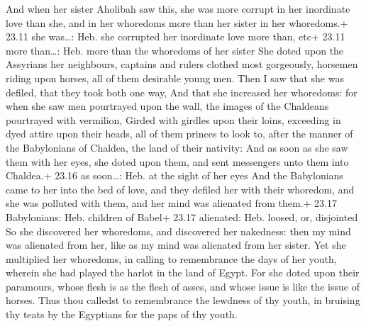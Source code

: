  And when her sister Aholibah saw this, she was more
corrupt in her inordinate love than she, and in her whoredoms more than
her sister in her whoredoms.+ 23.11 she was\ldots: Heb. she corrupted
her inordinate love more than, etc+ 23.11 more than\ldots: Heb. more
than the whoredoms of her sister  She doted upon the
Assyrians her neighbours, captains and rulers clothed most gorgeously,
horsemen riding upon horses, all of them desirable young men.
 Then I saw that she was defiled, that they took both one
way,  And that she increased her whoredoms: for when she
saw men pourtrayed upon the wall, the images of the Chaldeans pourtrayed
with vermilion,  Girded with girdles upon their loins,
exceeding in dyed attire upon their heads, all of them princes to look
to, after the manner of the Babylonians of Chaldea, the land of their
nativity:  And as soon as she saw them with her eyes, she
doted upon them, and sent messengers unto them into Chaldea.+ 23.16 as
soon\ldots: Heb. at the sight of her eyes  And the
Babylonians came to her into the bed of love, and they defiled her with
their whoredom, and she was polluted with them, and her mind was
alienated from them.+ 23.17 Babylonians: Heb. children of Babel+ 23.17
alienated: Heb. loosed, or, disjointed  So she discovered
her whoredoms, and discovered her nakedness: then my mind was alienated
from her, like as my mind was alienated from her sister. 
Yet she multiplied her whoredoms, in calling to remembrance the days of
her youth, wherein she had played the harlot in the land of Egypt.
 For she doted upon their paramours, whose flesh is as the
flesh of asses, and whose issue is like the issue of horses.
 Thus thou calledst to remembrance the lewdness of thy
youth, in bruising thy teats by the Egyptians for the paps of thy youth.

